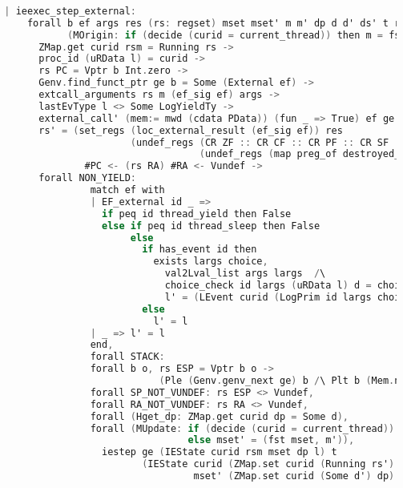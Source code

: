 \begin{lstlisting}[language=C]
                          
  | ieexec_step_external:
      forall b ef args res (rs: regset) mset mset' m m' dp d d' ds' t rs' curid rsm l l'
             (MOrigin: if (decide (curid = current_thread)) then m = fst mset else m = snd mset),
        ZMap.get curid rsm = Running rs ->
        proc_id (uRData l) = curid ->
        rs PC = Vptr b Int.zero ->
        Genv.find_funct_ptr ge b = Some (External ef) ->
        extcall_arguments rs m (ef_sig ef) args ->
        lastEvType l <> Some LogYieldTy ->
        external_call' (mem:= mwd (cdata PData)) (fun _ => True) ef ge args (m, (uRData l, d)) t res (m', (ds',d')) ->
        rs' = (set_regs (loc_external_result (ef_sig ef)) res 
                        (undef_regs (CR ZF :: CR CF :: CR PF :: CR SF :: CR OF :: nil)
                                    (undef_regs (map preg_of destroyed_at_call) rs))) 
                #PC <- (rs RA) #RA <- Vundef ->
        forall NON_YIELD: 
                 match ef with
                 | EF_external id _ => 
                   if peq id thread_yield then False
                   else if peq id thread_sleep then False
                        else
                          if has_event id then
                            exists largs choice,
                              val2Lval_list args largs  /\
                              choice_check id largs (uRData l) d = choice /\ 
                              l' = (LEvent curid (LogPrim id largs choice (snap_func d)) :: l) 
                          else
                            l' = l
                 | _ => l' = l
                 end,
                 forall STACK:
                 forall b o, rs ESP = Vptr b o ->
                             (Ple (Genv.genv_next ge) b /\ Plt b (Mem.nextblock m)),
                 forall SP_NOT_VUNDEF: rs ESP <> Vundef,
                 forall RA_NOT_VUNDEF: rs RA <> Vundef,
                 forall (Hget_dp: ZMap.get curid dp = Some d),
                 forall (MUpdate: if (decide (curid = current_thread)) then mset' = (m', snd mset)
                                  else mset' = (fst mset, m')),
                   iestep ge (IEState curid rsm mset dp l) t 
                          (IEState curid (ZMap.set curid (Running rs') rsm) 
                                   mset' (ZMap.set curid (Some d') dp) l')

\end{lstlisting}

